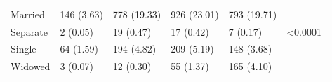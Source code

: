 \documentclass[times,sort&compress,3p]{elsarticle}
\theoremstyle{plain}
\theoremstyle{definition}
\begin{document}
\begin{table}[H]
\begin{tabular}{llllll}
Married          & 146 (3.63)                                                   & 778 (19.33)  & 926 (23.01)  & 793 (19.71)  &                    \\
Separate         & 2 (0.05)                                                     & 19 (0.47)    & 17 (0.42)    & 7 (0.17)     & \textless   0.0001 \\
Single           & 64 (1.59)                                                    & 194 (4.82)   & 209 (5.19)   & 148 (3.68)   &                    \\
Widowed          & 3 (0.07)                                                     & 12 (0.30)    & 55 (1.37)    & 165 (4.10)   &                    \\ \hline

\end{tabular}
\end{table}
\end{document}
